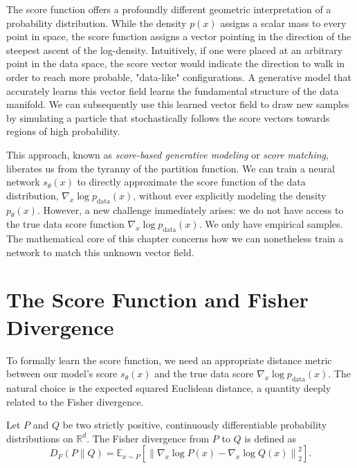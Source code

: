 The score function offers a profoundly different geometric interpretation of a probability distribution. While the density $p(x)$ assigns a scalar mass to every point in space, the score function assigns a vector pointing in the direction of the steepest ascent of the log-density. Intuitively, if one were placed at an arbitrary point in the data space, the score vector would indicate the direction to walk in order to reach more probable, "data-like" configurations. A generative model that accurately learns this vector field learns the fundamental structure of the data manifold. We can subsequently use this learned vector field to draw new samples by simulating a particle that stochastically follows the score vectors towards regions of high probability.

This approach, known as \textit{score-based generative modeling} or \textit{score matching}, liberates us from the tyranny of the partition function. We can train a neural network $s_\theta(x)$ to directly approximate the score function of the data distribution, $\nabla_x \log p_{\text{data}}(x)$, without ever explicitly modeling the density $p_\theta(x)$. However, a new challenge immediately arises: we do not have access to the true data score function $\nabla_x \log p_{\text{data}}(x)$. We only have empirical samples. The mathematical core of this chapter concerns how we can nonetheless train a network to match this unknown vector field.

\section{The Score Function and Fisher Divergence}

To formally learn the score function, we need an appropriate distance metric between our model's score $s_\theta(x)$ and the true data score $\nabla_x \log p_{\text{data}}(x)$. The natural choice is the expected squared Euclidean distance, a quantity deeply related to the Fisher divergence.

\begin{definition}
Let $P$ and $Q$ be two strictly positive, continuously differentiable probability distributions on $\mathbb{R}^d$. The Fisher divergence from $P$ to $Q$ is defined as
\begin{equation}
    D_F(P \parallel Q) = \mathbb{E}_{x \sim P} \left[ \left\| \nabla_x \log P(x) - \nabla_x \log Q(x) \right\|_2^2 \right].
\end{equation}
\end{definition}

